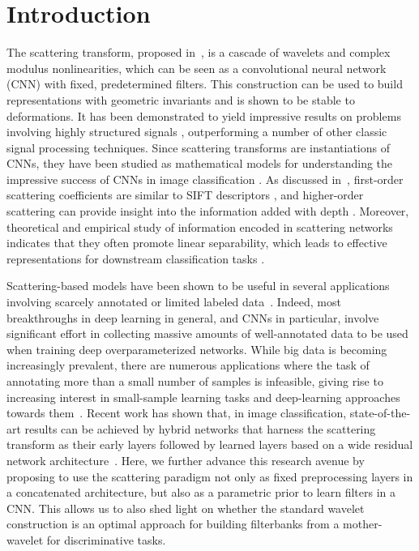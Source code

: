 \documentclass[10pt,twocolumn,letterpaper]{article}
\begin{document}
\section{Introduction}
\label{sec:introduction}



The scattering transform, proposed in~\cite{mallat2012group}, is a cascade of wavelets and complex modulus nonlinearities, which can be seen as a convolutional neural network (CNN) with fixed, predetermined filters. This construction can be used to build representations with geometric invariants and is shown to be stable to deformations. It has been demonstrated to yield impressive results on problems involving highly structured signals \cite{bruna2013invariant,oyallon2013generic, anden2014deep, sifre2014rigid, hirn2015quantum, hirn2017wavelet, eickenberg2018solid, anden2019joint, sinz2020wavelet, perlmutter2020geometric}, outperforming a number of other classic signal processing techniques. Since scattering transforms are instantiations of CNNs, they have been studied as mathematical models for understanding the impressive success of CNNs in image classification \cite{bruna2013invariant,mallat2016understanding}. As discussed in~\cite{bruna2013invariant}, first-order scattering coefficients are similar to SIFT descriptors \cite{SIFT}, and higher-order scattering can provide insight into the information added with depth \cite{mallat2016understanding}. Moreover, theoretical and empirical study of information encoded in scattering networks indicates that they often promote linear separability, which leads to effective representations for downstream classification tasks \cite{bruna2013invariant,oyallon2017scaling,anden2015joint,eickenberg2018solid}.

Scattering-based models have been shown to be useful in several applications involving scarcely annotated or limited labeled data~\cite{bruna2013invariant,sifre2013rotation,oyallon2018replearning,eickenberg2018solid}. Indeed, most breakthroughs in deep learning in general, and CNNs in particular, involve significant effort in collecting massive amounts of well-annotated data to be used when training deep overparameterized networks. While big data is becoming increasingly prevalent, there are numerous applications where the task of annotating more than a small number of samples is infeasible, giving rise to increasing interest in small-sample learning tasks and deep-learning approaches towards them~\cite{ barz2020deep,learnfewsamples, Worrall_2017_CVPR}. Recent work has shown that, in image classification, state-of-the-art results can be achieved by hybrid networks that harness the scattering transform as their early layers followed by learned layers based on a wide residual network architecture~\cite{oyallon2018replearning}. Here, we further advance this research avenue by proposing to use the scattering paradigm not only as fixed preprocessing layers in a concatenated architecture, but also as a parametric prior to learn filters in a CNN. This allows us to also shed light on whether the  standard wavelet construction \cite{mallat1999wavelet} is an optimal approach for building filterbanks from a mother-wavelet for discriminative tasks.
\end{document}
